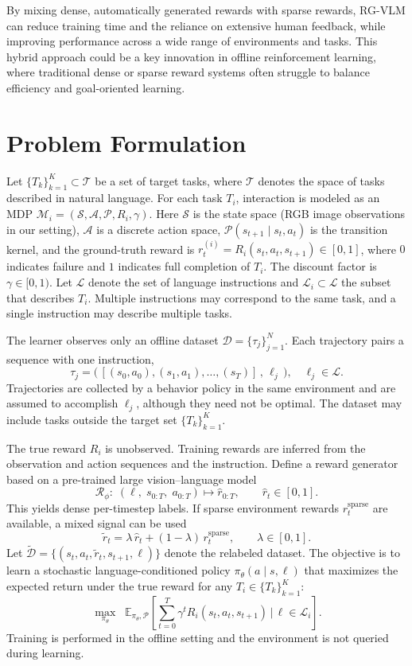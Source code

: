 \documentclass[master,english,final]{kaist-ucs}
\begin{document}
By mixing dense, automatically generated rewards with sparse rewards, RG-VLM can reduce training time and the reliance on extensive human feedback, while improving performance across a wide range of environments and tasks. This hybrid approach could be a key innovation in offline reinforcement learning, where traditional dense or sparse reward systems often struggle to balance efficiency and goal-oriented learning.

\section{Problem Formulation}
Let $\{T_k\}_{k=1}^K \subset \mathcal{T}$ be a set of target tasks, where $\mathcal{T}$ denotes the space of tasks described in natural language. For each task $T_i$, interaction is modeled as an MDP $\mathcal{M}_i=(\mathcal{S}, \mathcal{A}, \mathcal{P}, R_i, \gamma)$. Here $\mathcal{S}$ is the state space (RGB image observations in our setting), $\mathcal{A}$ is a discrete action space, $\mathcal{P}(s_{t+1}\mid s_t,a_t)$ is the transition kernel, and the ground-truth reward is $r_t^{(i)}=R_i(s_t,a_t,s_{t+1})\in[0,1]$, where $0$ indicates failure and $1$ indicates full completion of $T_i$. The discount factor is $\gamma\in[0,1)$. Let $\mathcal{L}$ denote the set of language instructions and $\mathcal{L}_i\subset\mathcal{L}$ the subset that describes $T_i$. Multiple instructions may correspond to the same task, and a single instruction may describe multiple tasks.

The learner observes only an offline dataset $\mathcal{D}=\{\tau_j\}_{j=1}^N$. Each trajectory pairs a sequence with one instruction,
\[
\tau_j=\big(\,[(s_0,a_0),(s_1,a_1),\ldots,(s_T)]\,,\, \ell_j\,\big), \quad \ell_j\in\mathcal{L}.
\]
Trajectories are collected by a behavior policy in the same environment and are assumed to accomplish $\ell_j$, although they need not be optimal. The dataset may include tasks outside the target set $\{T_k\}_{k=1}^K$.

The true reward $R_i$ is unobserved. Training rewards are inferred from the observation and action sequences and the instruction. Define a reward generator based on a pre-trained large vision–language model
\[
\mathcal{R}_\phi:\; (\ell,\; s_{0:T},\; a_{0:T})\mapsto \hat{r}_{0:T}, \qquad \hat{r}_t\in[0,1].
\]
This yields dense per-timestep labels. If sparse environment rewards $r_t^{\text{sparse}}$ are available, a mixed signal can be used
\[
\tilde{r}_t=\lambda\,\hat{r}_t+(1-\lambda)\,r_t^{\text{sparse}}, \qquad \lambda\in[0,1].
\]
Let $\tilde{\mathcal{D}}=\{(s_t,a_t,\tilde{r}_t,s_{t+1},\ell)\}$ denote the relabeled dataset. The objective is to learn a stochastic language-conditioned policy $\pi_\theta(a\mid s,\ell)$ that maximizes the expected return under the true reward for any $T_i\in\{T_k\}_{k=1}^K$:
\[
\max_{\pi_\theta}\;\; \mathbb{E}_{\pi_\theta,\mathcal{P}}\!\left[\sum_{t=0}^{T}\gamma^t R_i(s_t,a_t,s_{t+1}) \,\Big|\, \ell\in\mathcal{L}_i\right].
\]
Training is performed in the offline setting and the environment is not queried during learning.
\end{document}
